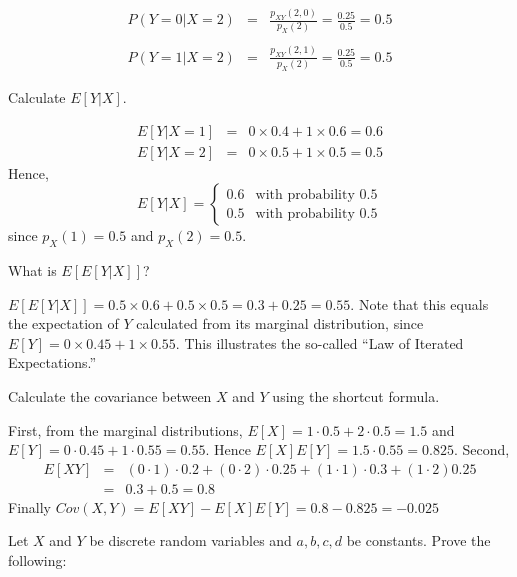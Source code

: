 \documentclass[addpoints,12pt]{exam}
\begin{document}
\begin{questions}
\begin{parts}
\begin{solution}
				\begin{eqnarray*}
					P(Y = 0|X = 2) &=&\frac{p_{XY}(2,0)}{p_X(2)} = \frac{0.25}{0.5} = 0.5\\\\
					P(Y = 1|X= 2) &=&\frac{p_{XY}(2,1)}{p_X(2)} = \frac{0.25}{0.5} = 0.5
				\end{eqnarray*}
			\end{solution}
		\item Calculate $E[Y|X]$.
			\begin{solution}
			\begin{eqnarray*}
				E[Y | X =1 ] &=& 0 \times 0.4 + 1 \times 0.6 = 0.6\\
				E[Y | X =2 ] &=& 0 \times 0.5 + 1 \times 0.5 = 0.5
			\end{eqnarray*}
			Hence, 
				$$E[Y|X] = \left\{ \begin{array}{ll} 0.6  & \mbox{with probability } 0.5\\ 0.5& \mbox{with probability } 0.5\end{array} \right.$$
				since $p_X(1) = 0.5$ and $p_X(2) = 0.5$.
			\end{solution}
		\item What is $E[E[Y|X]]$?
			\begin{solution}
			$E[E[Y|X]] = 0.5 \times 0.6 + 0.5 \times 0.5 = 0.3 + 0.25 = 0.55$. Note that this equals the expectation of $Y$ calculated from its marginal distribution, since $E[Y] = 0 \times 0.45 + 1 \times 0.55$. This illustrates the so-called ``Law of Iterated Expectations.''
			\end{solution}
		\item Calculate the covariance between $X$ and $Y$ using the shortcut formula.
		\begin{solution}
		First, from the marginal distributions, $E[X] = 1\cdot 0.5 + 2 \cdot 0.5 = 1.5$ and $E[Y]=0 \cdot 0.45 + 1 \cdot 0.55 = 0.55$. Hence $E[X]E[Y] = 1.5 \cdot 0.55 = 0.825$. Second,
			\begin{eqnarray*}
				E[XY] &=& (0\cdot 1) \cdot 0.2 + (0\cdot 2)\cdot 0.25 + (1\cdot 1) \cdot 0.3 + (1\cdot 2) 0.25\\
						&=& 0.3 + 0.5 = 0.8
			\end{eqnarray*}
			Finally $Cov(X,Y) = E[XY] - E[X]E[Y] = 0.8 - 0.825 = -0.025$
		\end{solution}
	\end{parts}

\question Let $X$ and $Y$ be discrete random variables and $a,b,c,d$ be constants. Prove the following:
	\begin{parts}

\end{parts}
\end{questions}
\end{document}
